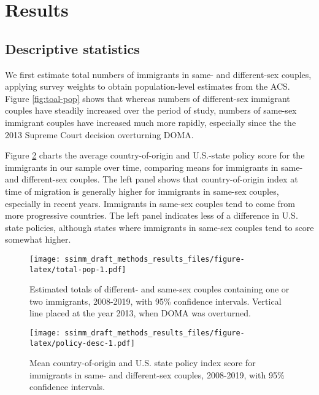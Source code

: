 \documentclass[11pt,]{article}
\begin{document}
\hypertarget{results}{%
\section{Results}\label{results}}

\hypertarget{descriptive-statistics}{%
\subsection{Descriptive statistics}\label{descriptive-statistics}}

We first estimate total numbers of immigrants in same- and different-sex couples, applying survey weights to obtain population-level estimates from the ACS. Figure \ref{fig:toal-pop} shows that whereas numbers of different-sex immigrant couples have steadily increased over the period of study, numbers of same-sex immigrant couples have increased much more rapidly, especially since the the 2013 Supreme Court decision overturning DOMA.

Figure \ref{fig:policy-desc} charts the average country-of-origin and U.S.-state policy score for the immigrants in our sample over time, comparing means for immigrants in same- and different-sex couples. The left panel shows that country-of-origin index at time of migration is generally higher for immigrants in same-sex couples, especially in recent years. Immigrants in same-sex couples tend to come from more progressive countries. The left panel indicates less of a difference in U.S. state policies, although states where immigrants in same-sex couples tend to score somewhat higher.

\begin{figure}
\centering
\texttt{[image: ssimm\_draft\_methods\_results\_files/figure-latex/total-pop-1.pdf]}
\caption{\label{fig:total-pop}Estimated totals of different- and same-sex couples containing one or two immigrants, 2008-2019, with 95\% confidence intervals. Vertical line placed at the year 2013, when DOMA was overturned.}
\end{figure}

\begin{figure}
\centering
\texttt{[image: ssimm\_draft\_methods\_results\_files/figure-latex/policy-desc-1.pdf]}
\caption{\label{fig:policy-desc}Mean country-of-origin and U.S. state policy index score for immigrants in same- and different-sex couples, 2008-2019, with 95\% confidence intervals.}
\end{figure}
\end{document}

